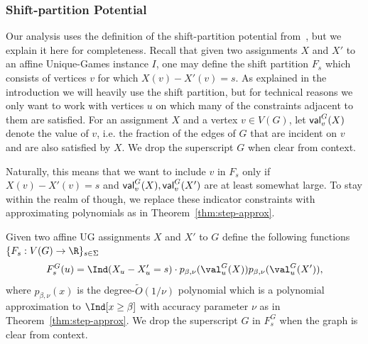 \subsubsection{Shift-partition Potential~\cite{BBKSS}}
Our analysis uses the definition of the shift-partition potential from~\cite{BBKSS}, but we explain it here for completeness. 
Recall that given two assignments $X$ and 
$X'$ to an affine Unique-Games instance $I$, 
one may define the shift partition 
$F_s$ which consists of vertices $v$ for 
which $X(v) - X'(v) = s$. As explained 
in the introduction we will heavily use the shift partition, but for 
technical reasons we only want to work with vertices $u$ on which many of the constraints adjacent to them are satisfied. For an assignment $X$ and a vertex $v \in V(G)$, let ${\sf val}_v^G(X)$ denote the value of $v$, i.e. the fraction of the edges of $G$ that are incident on $v$ and are also satisfied by $X$. We drop the superscript $G$ when clear from context.

Naturally, 
this means that we want to include $v$ in $F_s$ only if $X(v) - X'(v) = s$ and ${\sf val}^G_v(X), {\sf val}^G_v(X')$ are at least 
somewhat large. To stay within the realm of
\sos though, we replace these indicator constraints with approximating polynomials 
as in Theorem~\ref{thm:step-approx}.


\begin{definition}
Given two affine UG assignments $X$ and $X'$ to $G$ define the following functions $\{F_s:V(G) \to \R\}_{s \in \Sigma}$ \begin{equation}
F_{s}^G(u) = \Ind(X_u - X'_u = s) \cdot p_{\beta,\nu}(\val^{G}_u(X))p_{\beta,\nu}(\val_u^{G}(X')),\label{eq:fs-j}
\end{equation}
where $p_{\beta,\nu}(x)$ is the degree-$\tilde{O}(1/\nu)$ polynomial which is a polynomial approximation to $\Ind[x \geq \beta]$ with accuracy parameter $\nu$ as in Theorem~\ref{thm:step-approx}. We drop the superscript $G$ in $F_s^G$ when the graph is clear from context.
\end{definition}


